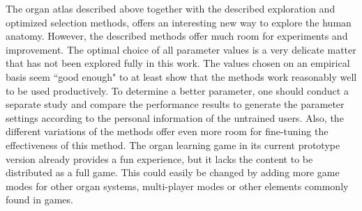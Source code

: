 The organ atlas described above together with the described exploration and optimized selection methods, offers an interesting new way to explore the human anatomy. However, the described methods offer much room for experiments and improvement. The optimal choice of all parameter values is a very delicate matter that has not been explored fully in this work. The values chosen on an empirical basis seem ``good enough" to at least show that the methods work reasonably well to be used productively. To determine a better parameter, one should conduct a separate study and compare the performance results to generate the parameter settings according to the personal information of the untrained users. Also, the different variations of the methods offer even more room for fine-tuning the effectiveness of this method. 
The organ learning game in its current prototype version already provides a fun experience, but it lacks the content to be distributed as a full game. This could easily be changed by adding more game modes for other organ systems, multi-player modes or other elements commonly found in games.
 
